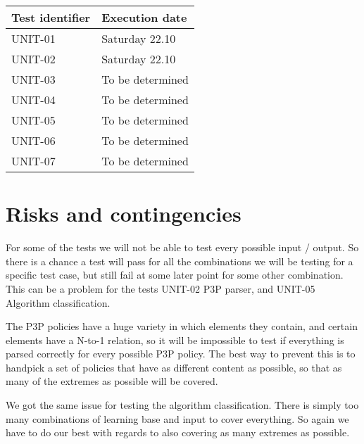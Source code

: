\documentclass[12pt, fullpage, oneside]{report}
\begin{document}
		\begin{center}
			\begin{tabular}{ |  p{5cm} | p{5cm} | }
				\hline
				Test identifier & Execution date \\ [5pt] \hline \hline
				UNIT-01 & Saturday 22.10 \\  [5pt] \hline
				UNIT-02 & Saturday 22.10 \\  [5pt] \hline
				UNIT-03 & To be determined \\  [5pt] \hline
				UNIT-04 & To be determined \\  [5pt] \hline
				UNIT-05 & To be determined \\  [5pt] \hline
				UNIT-06 & To be determined \\  [5pt] \hline
				UNIT-07 & To be determined \\  [5pt] \hline
			\end{tabular}
		\end{center}

	\section{Risks and contingencies}
		For some of the tests we will not be able to test every possible input / output. So there is a chance a test will pass for all the combinations we will be testing for a specific test case, but still fail at some later point for some other combination. This can be a problem for the tests 				UNIT-02 P3P parser, and UNIT-05 Algorithm classification.

		The P3P policies have a huge variety in which elements they contain, and certain elements have a N-to-1 relation, so it will be impossible to test if everything is parsed correctly for every possible P3P policy. The best way to prevent this is to handpick a set of policies that have as 				different content as possible, so that as many of the extremes as possible will be covered.

		We got the same issue for testing the algorithm classification. There is simply too many combinations of learning base and input to cover everything. So again we have to do our best with regards to also covering as many extremes as possible.
\end{document}
